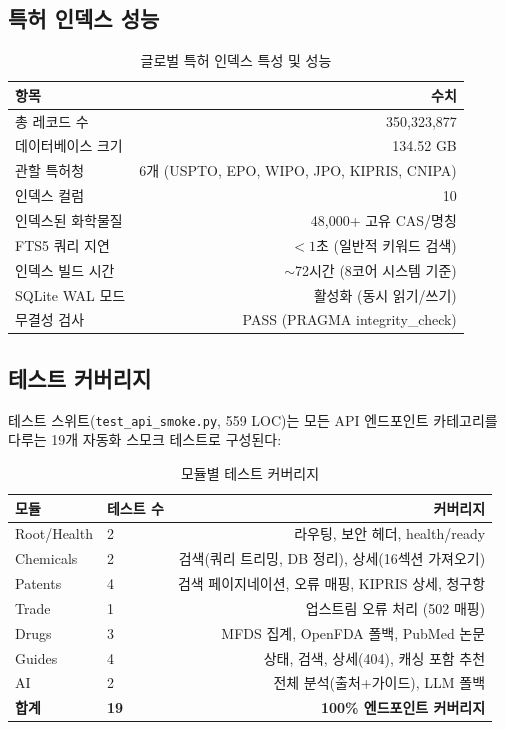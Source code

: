 \documentclass[preprint,12pt]{elsarticle}
\begin{document}
\subsection{특허 인덱스 성능}

\begin{table}[H]
\centering
\caption{글로벌 특허 인덱스 특성 및 성능}
\label{tab:patent_perf}
\begin{tabular}{@{}lr@{}}
\toprule
\textbf{항목} & \textbf{수치} \\
\midrule
총 레코드 수 & 350,323,877 \\
데이터베이스 크기 & 134.52 GB \\
관할 특허청 & 6개 (USPTO, EPO, WIPO, JPO, KIPRIS, CNIPA) \\
인덱스 컬럼 & 10 \\
인덱스된 화학물질 & 48,000+ 고유 CAS/명칭 \\
FTS5 쿼리 지연 & $< 1$초 (일반적 키워드 검색) \\
인덱스 빌드 시간 & $\sim$72시간 (8코어 시스템 기준) \\
SQLite WAL 모드 & 활성화 (동시 읽기/쓰기) \\
무결성 검사 & PASS (PRAGMA integrity\_check) \\
\bottomrule
\end{tabular}
\end{table}

\subsection{테스트 커버리지}

테스트 스위트(\texttt{test\_api\_smoke.py}, 559 LOC)는 모든 API 엔드포인트 카테고리를 다루는 19개 자동화 스모크 테스트로 구성된다:

\begin{table}[H]
\centering
\caption{모듈별 테스트 커버리지}
\label{tab:tests}
\small
\begin{tabular}{@{}llr@{}}
\toprule
\textbf{모듈} & \textbf{테스트 수} & \textbf{커버리지} \\
\midrule
Root/Health & 2 & 라우팅, 보안 헤더, health/ready \\
Chemicals & 2 & 검색(쿼리 트리밍, DB 정리), 상세(16섹션 가져오기) \\
Patents & 4 & 검색 페이지네이션, 오류 매핑, KIPRIS 상세, 청구항 \\
Trade & 1 & 업스트림 오류 처리 (502 매핑) \\
Drugs & 3 & MFDS 집계, OpenFDA 폴백, PubMed 논문 \\
Guides & 4 & 상태, 검색, 상세(404), 캐싱 포함 추천 \\
AI & 2 & 전체 분석(출처+가이드), LLM 폴백 \\
\midrule
\textbf{합계} & \textbf{19} & \textbf{100\% 엔드포인트 커버리지} \\
\bottomrule
\end{tabular}
\end{table}
\end{document}
